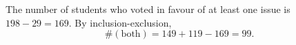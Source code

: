 The number of students who voted in favour of at least one issue is $198-29=169$. By inclusion-exclusion,
\[\#(\text{both})=149+119-169=\boxed{99}.\]
